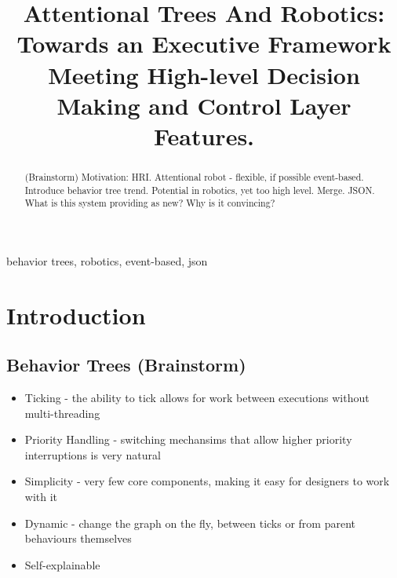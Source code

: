 \documentclass[conference]{IEEEtran}
\begin{document}
\title{Attentional Trees And Robotics: Towards an Executive Framework Meeting High-level Decision Making and Control Layer Features.\\
}

\author{
\and
{}
\and
{}
}

\maketitle

\begin{abstract}
(Brainstorm) Motivation: HRI. Attentional robot - flexible, if possible event-based. Introduce behavior tree trend. Potential in robotics, yet too high level. Merge. JSON. What is this system providing as new? Why is it convincing?
\end{abstract}

\begin{IEEEkeywords}
behavior trees, robotics, event-based, json
\end{IEEEkeywords}

\section{Introduction}
\subsection{Behavior Trees (Brainstorm)}
\begin{itemize}
\item Ticking - the ability to tick allows for work between executions without multi-threading
\item Priority Handling - switching mechansims that allow higher priority interruptions is very natural
\item Simplicity - very few core components, making it easy for designers to work with it
\item Dynamic - change the graph on the fly, between ticks or from parent behaviours themselves
\item Self-explainable
\end{itemize}
\end{document}
